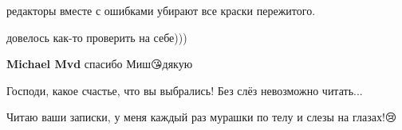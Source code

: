 редакторы вместе с ошибками убирают все краски пережитого.

довелось как-то проверить на себе)))

\begin{itemize} %
\textbf{Michael Mvd} спасибо Миш😘дякую
\end{itemize} %


Господи, какое счастье, что вы выбрались! Без слёз невозможно читать...


Читаю ваши записки, у меня каждый раз мурашки по телу и слезы на глазах!😢
